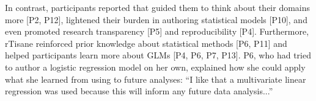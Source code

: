 In contrast, participants reported that \rTisane guided them to think about
their domains more [P2, P12], lightened their burden in authoring statistical
models [P10], and even promoted research transparency [P5] and reproducibility
[P4]. Furthermore, rTisane reinforced prior knowledge about statistical methods
[P6, P11] and helped participants learn more about GLMs [P4, P6, P7, P13]. P6,
who had tried to author a logistic regression model on her own, explained how
she could apply what she learned from using \rTisane to future analyses: ``I
like that a multivariate linear regression was used because this will inform
any future data analysis...''

\begin{comment}
Nevertheless, participants expected \rTisane to do more automatically.
Participants were expected rTisane’s output statistical model to include more
IVs [P2, P5], have interaction terms [P5, P6], and have coefficient values that
were similar to ones from their own statistical models without rTisane [P10].
Yet, when asked if anything surprised them about rTisane’s output statistical
model, six participants said the models were as they expected [P4, 6, 10, 11,
12, 13]. 
\end{comment}



